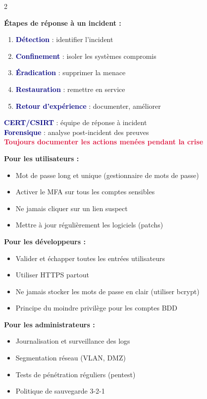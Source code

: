 \documentclass[a4paper,10pt]{article}
\newcommand{\key}[1]{\textbf{\textcolor{navy}{#1}}}
\newcommand{\warn}[1]{\textbf{\textcolor{crimson}{#1}}}
\begin{document}
\begin{multicols}{2}
\begin{tcolorbox}[basebox, colframe=orange, title=9. Gestion de crise — Réponse à incident]
\textbf{Étapes de réponse à un incident :}
\begin{enumerate}
  \item \key{Détection} : identifier l'incident
  \item \key{Confinement} : isoler les systèmes compromis
  \item \key{Éradication} : supprimer la menace
  \item \key{Restauration} : remettre en service
  \item \key{Retour d'expérience} : documenter, améliorer
\end{enumerate}
\vspace{4pt}
\key{CERT/CSIRT} : équipe de réponse à incident \\
\key{Forensique} : analyse post-incident des preuves \\
\warn{Toujours documenter les actions menées pendant la crise}
\end{tcolorbox}

\begin{tcolorbox}[basebox, colframe=green, title=10. Bonnes pratiques de sécurité]
\textbf{Pour les utilisateurs :}
\begin{itemize}
  \item Mot de passe long et unique (gestionnaire de mots de passe)
  \item Activer le MFA sur tous les comptes sensibles
  \item Ne jamais cliquer sur un lien suspect
  \item Mettre à jour régulièrement les logiciels (patchs)
\end{itemize}
\vspace{4pt}
\textbf{Pour les développeurs :}
\begin{itemize}
  \item Valider et échapper toutes les entrées utilisateurs
  \item Utiliser HTTPS partout
  \item Ne jamais stocker les mots de passe en clair (utiliser bcrypt)
  \item Principe du moindre privilège pour les comptes BDD
\end{itemize}
\vspace{4pt}
\textbf{Pour les administrateurs :}
\begin{itemize}
  \item Journalisation et surveillance des logs
  \item Segmentation réseau (VLAN, DMZ)
  \item Tests de pénétration réguliers (pentest)
  \item Politique de sauvegarde 3-2-1
\end{itemize}
\end{tcolorbox}

\end{multicols}
\end{document}
